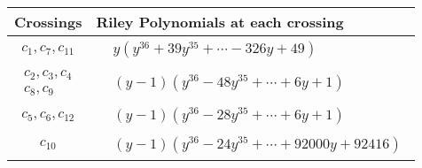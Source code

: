\documentclass[1p]{elsarticle_modified}
\theoremstyle{definition}
\begin{document}
\begin{tabular}{m{50pt}|m{274pt}}
Crossings & \hspace{64pt}Riley Polynomials at each crossing \\
\hline $$\begin{aligned}c_{1},c_{7},c_{11}\end{aligned}$$&$\begin{aligned}
&y(y^{36}+39 y^{35}+\cdots-326 y+49)
\end{aligned}$\\
\hline $$\begin{aligned}c_{2},c_{3},c_{4}\\c_{8},c_{9}\end{aligned}$$&$\begin{aligned}
&(y-1)(y^{36}-48 y^{35}+\cdots+6 y+1)
\end{aligned}$\\
\hline $$\begin{aligned}c_{5},c_{6},c_{12}\end{aligned}$$&$\begin{aligned}
&(y-1)(y^{36}-28 y^{35}+\cdots+6 y+1)
\end{aligned}$\\
\hline $$\begin{aligned}c_{10}\end{aligned}$$&$\begin{aligned}
&(y-1)(y^{36}-24 y^{35}+\cdots+92000 y+92416)
\end{aligned}$\\
\hline
\end{tabular}
\vskip 2pc
\end{document}
